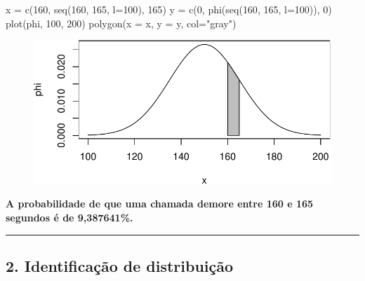 \documentclass[
  letterpaper,
  DIV=11,
  numbers=noendperiod]{scrartcl}
\newenvironment{Shaded}{\begin{snugshade}}{\end{snugshade}}
\newcommand{\AttributeTok}[1]{\textcolor[rgb]{0.40,0.45,0.13}{#1}}
\newcommand{\DecValTok}[1]{\textcolor[rgb]{0.68,0.00,0.00}{#1}}
\newcommand{\FunctionTok}[1]{\textcolor[rgb]{0.28,0.35,0.67}{#1}}
\newcommand{\NormalTok}[1]{\textcolor[rgb]{0.00,0.23,0.31}{#1}}
\newcommand{\OtherTok}[1]{\textcolor[rgb]{0.00,0.23,0.31}{#1}}
\newcommand{\StringTok}[1]{\textcolor[rgb]{0.13,0.47,0.30}{#1}}
\begin{document}
\begin{Shaded}
\begin{Highlighting}[]
\NormalTok{x }\OtherTok{=} \FunctionTok{c}\NormalTok{(}\DecValTok{160}\NormalTok{, }\FunctionTok{seq}\NormalTok{(}\DecValTok{160}\NormalTok{, }\DecValTok{165}\NormalTok{, }\AttributeTok{l=}\DecValTok{100}\NormalTok{), }\DecValTok{165}\NormalTok{)}
\NormalTok{y }\OtherTok{=} \FunctionTok{c}\NormalTok{(}\DecValTok{0}\NormalTok{, }\FunctionTok{phi}\NormalTok{(}\FunctionTok{seq}\NormalTok{(}\DecValTok{160}\NormalTok{, }\DecValTok{165}\NormalTok{, }\AttributeTok{l=}\DecValTok{100}\NormalTok{)), }\DecValTok{0}\NormalTok{)}
\FunctionTok{plot}\NormalTok{(phi, }\DecValTok{100}\NormalTok{, }\DecValTok{200}\NormalTok{)}
\FunctionTok{polygon}\NormalTok{(}\AttributeTok{x =}\NormalTok{ x, }\AttributeTok{y =}\NormalTok{ y, }\AttributeTok{col=}\StringTok{"gray"}\NormalTok{)}
\end{Highlighting}
\end{Shaded}

\begin{figure}[H]

{\centering \includegraphics{quiz5_files/figure-pdf/unnamed-chunk-9-1.pdf}

}

\end{figure}

\textbf{A probabilidade de que uma chamada demore entre 160 e 165
segundos é de 9,387641\%.}

\begin{center}\rule{0.5\linewidth}{0.5pt}\end{center}

\hypertarget{identificauxe7uxe3o-de-distribuiuxe7uxe3o}{%
\subsection{2. Identificação de
distribuição}\label{identificauxe7uxe3o-de-distribuiuxe7uxe3o}}
\end{document}
